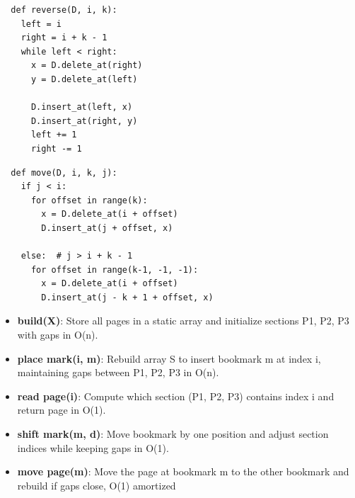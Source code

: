 \documentclass[12pt,twoside]{article}
\begin{document}
\begin{problems}
\newpage
\problem  %

\begin{problemparts}
\problempart %
\begin{lstlisting}
  def reverse(D, i, k):
    left = i
    right = i + k - 1
    while left < right:
      x = D.delete_at(right)
      y = D.delete_at(left)

      D.insert_at(left, x)
      D.insert_at(right, y)
      left += 1
      right -= 1
\end{lstlisting}

\problempart %
\begin{lstlisting}
  def move(D, i, k, j):
    if j < i:
      for offset in range(k):
        x = D.delete_at(i + offset)
        D.insert_at(j + offset, x)

    else:  # j > i + k - 1
      for offset in range(k-1, -1, -1):
        x = D.delete_at(i + offset)
        D.insert_at(j - k + 1 + offset, x)
\end{lstlisting}
\end{problemparts}

\problem %
\begin{itemize}
  \item \textbf{build(X)}: Store all pages in a static array and initialize sections P1, P2, P3 with gaps in O(n).
  \item \textbf{place mark(i, m)}: Rebuild array S to insert bookmark m at index i, maintaining gaps between P1, P2, P3 in O(n).
  \item \textbf{read page(i)}: Compute which section (P1, P2, P3) contains index i and return page in O(1).
  \item \textbf{shift mark(m, d)}: Move bookmark by one position and adjust section indices while keeping gaps in O(1).
  \item \textbf{move page(m)}: Move the page at bookmark m to the other bookmark and rebuild if gaps close, O(1) amortized
\end{itemize}

\newpage
\problem  %


\end{problems}
\end{document}
